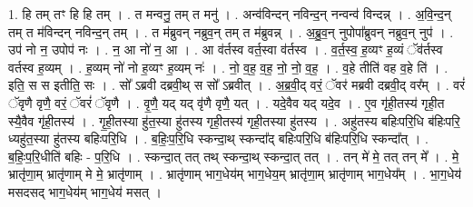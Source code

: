 \documentclass[17pt]{extarticle}
\begin{document}
1. हि तम् तꣳ हि हि तम् । . त मन्वनु॒ तम् त मनु॑ । . अन्व॑विन्दन् नविन्द॒न् नन्वन्व॑ विन्दन्न् । . अ॒वि॒न्द॒न् तम् त म॑विन्दन् नविन्द॒न् तम् । . त म॑ब्रुवन् नब्रुव॒न् तम् त म॑ब्रुवन्न् । . अ॒ब्रु॒व॒न् नुपोपा᳚ब्रुवन् नब्रुव॒न् नुप॑ । . उप॑ नो न॒ उपोप॑ नः । . न॒ आ नो॑ न॒ आ । . आ व॑र्तस्व वर्त॒स्वा व॑र्तस्व । . व॒र्त॒स्व॒ ह॒व्यꣳ ह॒व्यं ॅव॑र्तस्व वर्तस्व ह॒व्यम् । . ह॒व्यम् नो॑ नो ह॒व्यꣳ ह॒व्यम् नः॑ । . नो॒ व॒ह॒ व॒ह॒ नो॒ नो॒ व॒ह॒ । . व॒हे तीति॑ वह व॒हे ति॑ । . इति॒ स स इतीति॒ सः । . सो᳚ ऽब्रवी दब्रवी॒थ् स सो᳚ ऽब्रवीत् । . अ॒ब्र॒वी॒द् वरं॒ ॅवर॑ मब्रवी दब्रवी॒द् वर᳚म् । . वरं॑ ॅवृणै वृणै॒ वरं॒ ॅवरं॑ ॅवृणै । . वृ॒णै॒ यद् यद् वृ॑णै वृणै॒ यत् । . यदे॒वैव यद् यदे॒व । . ए॒व गृ॑ही॒तस्य॑ गृही॒त स्यै॒वैव गृ॑ही॒तस्य॑ । . गृ॒ही॒तस्या हु॑त॒स्या हु॑तस्य गृही॒तस्य॑ गृही॒तस्या हु॑तस्य । . अहु॑तस्य बहिःपरि॒धि ब॑हिःपरि॒ ध्यहु॑त॒स्या हु॑तस्य बहिःपरि॒धि । . ब॒हिः॒प॒रि॒धि स्कन्दा॒थ् स्कन्दा᳚द् बहिःपरि॒धि ब॑हिःपरि॒धि स्कन्दा᳚त् । . ब॒हिः॒प॒रि॒धीति॑ बहिः - प॒रि॒धि । . स्कन्दा॒त् तत् तथ् स्कन्दा॒थ् स्कन्दा॒त् तत् । . तन् मे॑ मे॒ तत् तन् मे᳚ । . मे॒ भ्रातृ॑णा॒म् भ्रातृ॑णाम् मे मे॒ भ्रातृ॑णाम् । . भ्रातृ॑णाम् भाग॒धेय॑म् भाग॒धेय॒म् भ्रातृ॑णा॒म् भ्रातृ॑णाम् भाग॒धेय᳚म् । . भा॒ग॒धेय॑ मसदसद् भाग॒धेय॑म् भाग॒धेय॑ मसत् । \newline
\end{document}
